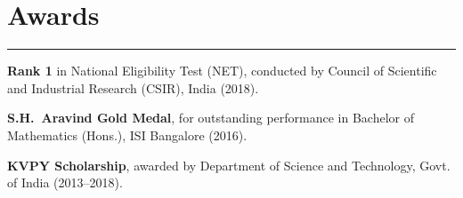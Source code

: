 \documentclass[11pt]{article}
\newcommand{\SectionRule}{\vspace{-0.3em}\noindent\rule{\linewidth}{1.2pt}\vspace{0.6em}}
\begin{document}
\section*{Awards}
\SectionRule
\begin{etaremune} 
  \item \textbf{Rank 1} in National Eligibility Test (NET), conducted by Council of Scientific and Industrial Research (CSIR), India (2018).
  \item \textbf{S.H.\ Aravind Gold Medal}, for outstanding performance in Bachelor of Mathematics (Hons.), ISI Bangalore (2016).
  \item \textbf{KVPY Scholarship}, awarded by Department of Science and Technology, Govt. of India (2013--2018).
\end{etaremune}
\end{document}
